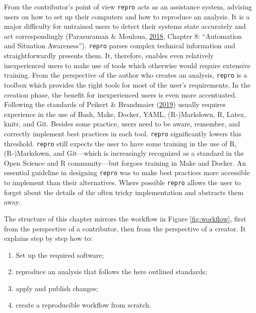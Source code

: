 \documentclass[12pt,a4paper,twoside]{article}
\providecommand{\tightlist}{%
  \setlength{\itemsep}{0pt}\setlength{\parskip}{0pt}}
\begin{document}
From the contributor's point of view \texttt{repro} acts as an assistance system, advising users on how to set up their computers and how to reproduce an analysis.
It is a major difficulty for untrained users to detect their systems state accurately and act correspondingly (Parasuraman \& Mouloua, \protect\hyperlink{ref-parasuramanAutomationHumanPerformance2018}{2018}, Chapter 8: ``Automation and Situation Awareness'').
\texttt{repro} parses complex technical information and straightforwardly presents them.
It, therefore, enables even relatively inexperienced users to make use of tools which otherwise would require extensive training.
From the perspective of the author who creates an analysis, \texttt{repro} is a toolbox which provides the right tools for most of the user's requirements.
In the creation phase, the benefit for inexperienced users is even more accentuated.
Following the standards of Peikert \& Brandmaier (\protect\hyperlink{ref-peikertReproducibleDataAnalysis2019}{2019}) usually requires experience in the use of Bash, Make, Docker, YAML, (R-)Markdown, R, Latex, knitr, and Git.
Besides some practice, users need to be aware, remember, and correctly implement best practices in each tool.
\texttt{repro} significantly lowers this threshold.
\texttt{repro} still expects the user to have some training in the use of R, (R-)Markdown, and Git---which is increasingly recognized as a standard in the Open Science and R community---but forgoes training in Make and Docker.
An essential guideline in designing \texttt{repro} was to make best practices more accessible to implement than their alternatives.
Where possible \texttt{repro} allows the user to forget about the details of the often tricky implementation and abstracts them away.

The structure of this chapter mirrors the workflow in Figure \ref{fig:workflow}, first from the perspective of a contributor, then from the perspective of a creator.
It explains step by step how to:

\begin{enumerate}
\def\labelenumi{\arabic{enumi}.}
\tightlist
\item
  Set up the required software;
\item
  reproduce an analysis that follows the here outlined standards;
\item
  apply and publish changes;
\item
  create a reproducible workflow from scratch.
\end{enumerate}
\end{document}

